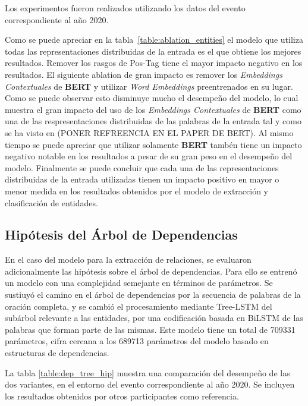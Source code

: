 Los experimentos fueron realizados utilizando los datos del evento correspondiente al año 2020.

Como se puede apreciar en la tabla~\ref{table:ablation_entities} el modelo que utiliza todas las representaciones distribuidas de la entrada es el que obtiene los mejores resultados. Remover los rasgos de Pos-Tag tiene el mayor impacto negativo en los resultados. El siguiente ablation de gran impacto es remover los \emph{Embeddings Contextuales} de \textbf{BERT} y utilizar \emph{Word Embeddings} preentrenados en su lugar. Como se puede observar esto disminuye mucho el desempe\~no del modelo, lo cual muestra el gran impacto del uso de los \emph{Embeddings Contextuales} de \textbf{BERT} como una de las respresentaciones distribuidas de las palabras de la entrada tal y como se ha visto en (PONER REFREENCIA EN EL PAPER DE BERT). Al mismo tiempo se puede apreciar que utilizar solamente \textbf{BERT} tamb\'en tiene un impacto negativo notable en los resultados a pesar de su gran peso en el desempe\~no del modelo. Finalmente se puede concluir que cada una de las representaciones distribuidas de la entrada utilizadas tienen un impacto positivo en mayor o menor medida en los resultados obtenidos por el modelo de extracci\'on y clasificaci\'on de entidades.

\subsection{Hipótesis del Árbol de Dependencias}

En el caso del modelo para la extracción de relaciones, se evaluaron adicionalmente las hipótesis sobre el árbol de dependencias.
Para ello se entrenó un modelo con una complejidad semejante en términos de parámetros.
Se sustiuyó el camino en el árbol de dependencias por la secuencia de palabras de la oración completa, y se cambió el procesamiento mediante Tree-LSTM del subárbol relevante a las entidades, por una codificación basada en BiLSTM de las palabras que forman parte de las mismas.
Este modelo tiene un total de 709331 parámetros, cifra cercana a los 689713 parámetros del modelo basado en estructuras de dependencias.

La tabla \ref{table:dep_tree_hip} muestra una comparación del desempeño de las dos variantes, en el entorno del evento correspondiente al año 2020. Se incluyen los resultados obtenidos por otros participantes como referencia.

